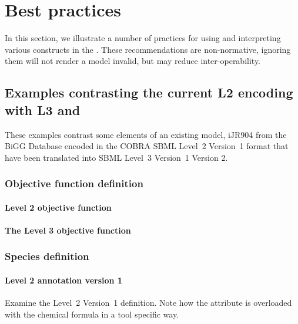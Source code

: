 
\section{Best practices}
\label{best-practices}
\begin{newsection}

In this section, we illustrate a number of practices for using and
interpreting various constructs in the \FBCPackage.
These recommendations are non-normative, ignoring them will not render a model invalid, but may reduce inter-operability.

\subsection{Examples contrasting the current \SBML L2 encoding with L3 and \FBC}
\label{best-practices-cobraV2}
These examples contrast some elements of an existing model, iJR904 from the \textsf{BiGG} Database encoded in the \textsf{COBRA} SBML Level~2 Version~1 format \citep{ijr904, bigg, cobra} that have been translated into SBML Level~3 Version~1 \FBC Version 2.

\subsubsection*{Objective function definition}
\paragraph{\SBML Level 2 objective function}

\paragraph{The \SBML Level 3 objective function}
\protect{}

\subsubsection*{Species definition}
\paragraph{\SBML Level 2 \Species annotation version 1}
Examine the \SBML Level~2 Version~1 \Species definition. Note how the  attribute is overloaded with the chemical formula in a tool specific way.
%


\end{newsection}
